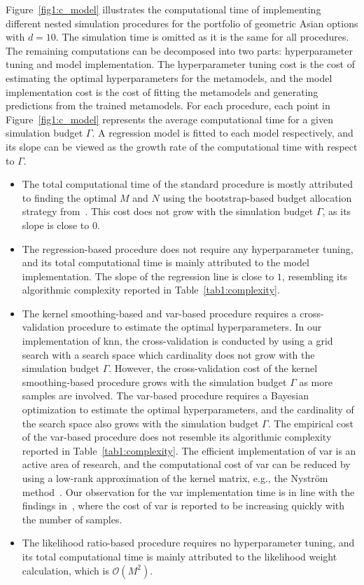 Figure~\ref{fig1:c_model} illustrates the computational time of implementing different nested simulation procedures for the portfolio of geometric Asian options with $d = 10$.
The simulation time is omitted as it is the same for all procedures.
The remaining computations can be decomposed into two parts: hyperparameter tuning and model implementation.
The hyperparameter tuning cost is the cost of estimating the optimal hyperparameters for the metamodels, and the model implementation cost is the cost of fitting the metamodels and generating predictions from the trained metamodels.
For each procedure, each point in Figure~\ref{fig1:c_model} represents the average computational time for a given simulation budget $\Gamma$.
A regression model is fitted to each model respectively, and its slope can be viewed as the growth rate of the computational time with respect to $\Gamma$.
\begin{itemize}
    \item The total computational time of the standard procedure is mostly attributed to finding the optimal $M$ and $N$ using the bootstrap-based budget allocation strategy from~\cite{zhang2021bootstrap}.
    This cost does not grow with the simulation budget $\Gamma$, as its slope is close to $0$.
    \item The regression-based procedure does not require any hyperparameter tuning, and its total computational time is mainly attributed to the model implementation.
    The slope of the regression line is close to $1$, resembling its algorithmic complexity reported in Table~\ref{tab1:complexity}.
    \item The kernel smoothing-based and \gls{var}-based procedure requires a cross-validation procedure to estimate the optimal hyperparameters. 
    In our implementation of \gls{knn}, the cross-validation is conducted by using a grid search with a search space which cardinality does not grow with the simulation budget $\Gamma$.
    However, the cross-validation cost of the kernel smoothing-based procedure grows with the simulation budget $\Gamma$ as more samples are involved.
    The \gls{var}-based procedure requires a Bayesian optimization to estimate the optimal hyperparameters, and the cardinality of the search space also grows with the simulation budget $\Gamma$.
    The empirical cost of the \gls{var}-based procedure does not resemble its algorithmic complexity reported in Table~\ref{tab1:complexity}.
    The efficient implementation of \gls{var} is an active area of research, and the computational cost of \gls{var} can be reduced by using a low-rank approximation of the kernel matrix, e.g., the Nystr\"om method~\citep{nystrom1930praktische}.
    Our observation for the \gls{var} implementation time is in line with the findings in~\cite{scikit-learn}, where the cost of \gls{var} is reported to be increasing quickly with the number of samples.
    \item The likelihood ratio-based procedure requires no hyperparameter tuning, and its total computational time is mainly attributed to the likelihood weight calculation, which is $\mathcal{O}(M^2)$. 
\end{itemize}
